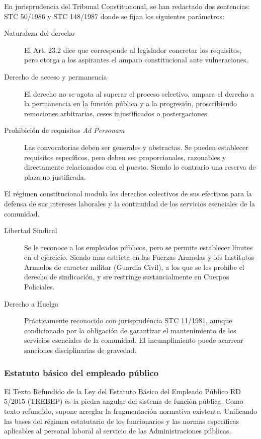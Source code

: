         En jurisprudencia del Tribunal Constitucional, se han redactado dos sentencias: STC 50/1986 y STC 148/1987 donde se fijan los siguientes parámetros:
        \begin{description}
            \item[Naturaleza del derecho] El Art. 23.2 dice que corresponde al legislador concretar los requisitos, pero otorga a los aspirantes el amparo constitucional ante vulneraciones.
            \item[Derecho de acceso y permanencia] El derecho no se agota al superar el proceso selectivo, ampara el derecho a la permanencia en la función pública y a la progresión, proscribiendo remociones arbitrarias, ceses injustificados o postergaciones.
            \item[Prohibición de requisitos \textit{Ad Personam}] Las convocatorias deben ser generales y abstractas. Se pueden establecer requisitos específicos, pero deben ser proporcionales, razonables y directamente relacionados con el puesto. Siendo lo contrario una reserva de plaza no justificada.
        \end{description}

        El régimen constitucional modula los derechos colectivos de sus efectivos para la defensa de sus intereses laborales y la continuidad de los servicios esenciales de la comunidad.
        \begin{description}
            \item[Libertad Sindical] Se le reconoce a los empleados públicos, pero se permite establecer límites en el ejercicio. Siendo mas estricta en las Fuerzas Armadas y los Institutos Armados de caracter militar (Guardia Civil), a los que se les prohibe el derecho de sindicación, y sre restringe sustancialmente en Cuerpos Policiales.
            \item[Derecho a Huelga] Prácticamente reconocido con jurisprudéncia STC 11/1981, aunque condicionado por la obligación de garantizar el mantenimiento de los servicios esenciales de la comunidad. El incumplimiento puede acarrear sanciones disciplinarias de gravedad.
        \end{description}

    \subsubsection{Estatuto básico del empleado público} %
        El Texto Refundido de la Ley del Estatuto Básico del Empleado Público RD 5/2015 (TREBEP) es la piedra angular del sistema de función pública. Como texto refundido, supone arreglar la fragmentación normativa existente. Unificando las bases del régimen estatutario de los funcionarios y las normas específicas aplicables al personal laboral al servicio de las Administraciones públicas.

